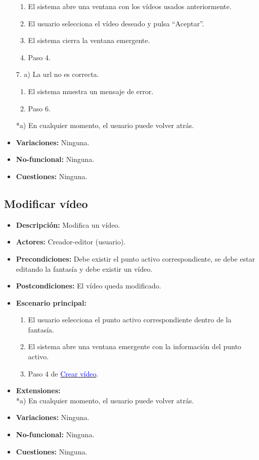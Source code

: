 \begin{itemize}
	\begin{enumerate}
		\item El sistema abre una ventana con los vídeos usados anteriormente.
		\item El usuario selecciona el vídeo deseado y pulsa ``Aceptar''.
		\item El sistema cierra la ventana emergente.
		\item Paso 4.
	\end{enumerate}
	7. a) La url no es correcta.
	\begin{enumerate}
		\item El sistema muestra un mensaje de error.
		\item Paso 6.
	\end{enumerate}
	*a) En cualquier momento, el usuario puede volver atrás.
	\item \textbf{Variaciones:} Ninguna.
	\item \textbf{No-funcional:} Ninguna.
	\item \textbf{Cuestiones:} Ninguna.
\end{itemize}

\subsection{Modificar vídeo}
\begin{itemize}
	\item \textbf{Descripción:} Modifica un vídeo.
	\item \textbf{Actores:} Creador-editor (usuario).
	\item \textbf{Precondiciones:} Debe existir el punto activo correspondiente, se debe estar editando la fantasía y debe existir un vídeo.
	\item \textbf{Postcondiciones:} El vídeo queda modificado.
	\item \textbf{Escenario principal:}
	\begin{enumerate}
		\item El usuario selecciona el punto activo correspondiente dentro de la fantasía.
		\item El sistema abre una ventana emergente con la información del punto activo.
		\item Paso 4 de \hyperlink{crearvideo}{\textcolor{blue}{Crear vídeo}}.
	\end{enumerate}
	\item \textbf{Extensiones:} \\ *a) En cualquier momento, el usuario puede volver atrás.
	\item \textbf{Variaciones:} Ninguna.
	\item \textbf{No-funcional:} Ninguna.
	\item \textbf{Cuestiones:} Ninguna.
\end{itemize}

